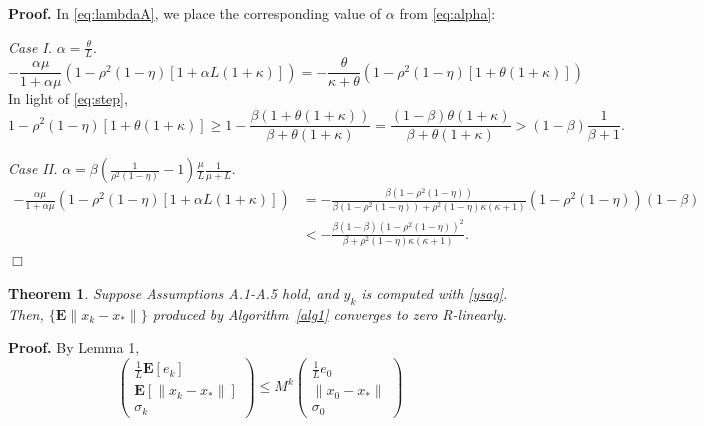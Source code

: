 \documentclass[11pt]{article}
\newtheorem{thm}{Theorem}
\newcommand{\E}{\mathbf{E}}
\begin{document}
\noindent 
\textbf{Proof.} In \eqref{eq:lambdaA}, we place the corresponding value of $\alpha$ from \eqref{eq:alpha}:

\bigskip

\textit{Case I.} $\alpha=\displaystyle\frac{\theta}{L}$. 
\[
 -\frac{\alpha\mu}{1+\alpha\mu}\left(1-\rho^2(1-\eta)[1+\alpha L(1+\kappa)]\right) = -\frac{\theta}{\kappa+\theta}\left(1-\rho^2(1-\eta)[1+\theta(1+\kappa)]\right)
\]
In light of \eqref{eq:step}, 
\[
 1-\rho^2(1-\eta)[1+\theta(1+\kappa)]\geq 1-\frac{\beta(1+\theta(1+\kappa))}{\beta+\theta(1+\kappa)} = \frac{(1-\beta)\theta(1+\kappa)}{\beta+\theta(1+\kappa)}> (1-\beta)\frac{1}{\beta+1}.
\]

\bigskip

\textit{Case II.} $\alpha = \displaystyle\beta\left(\frac{1}{\rho^2(1-\eta)}-1\right)\frac{\mu}{L}\frac{1}{\mu+L}$.
\begin{align*}
 -\frac{\alpha\mu}{1+\alpha\mu}\left(1-\rho^2(1-\eta)[1+\alpha L(1+\kappa)]\right) &= -\frac{\beta(1-\rho^2(1-\eta))}{\beta(1-\rho^2(1-\eta))+\rho^2(1-\eta)\kappa(\kappa+1)}(1-\rho^2(1-\eta))(1-\beta)\\
 & < -\frac{\beta(1-\beta)(1-\rho^2(1-\eta))^2}{\beta+\rho^2(1-\eta)\kappa(\kappa+1)}.
\end{align*}
\hspace*{\fill}$\Box$\medskip

\bigskip

\begin{thm}\label{thm:linear}
 Suppose Assumptions A.1-A.5 hold, and $y_k$ is computed with \eqref{ysag}.  Then, $\{\E\|x_k-x_\ast\|\}$ produced by Algorithm~\ref{alg1} converges to zero R-linearly.
\end{thm}

\noindent 
\textbf{Proof.}  By Lemma 1, 
\begin{equation}\label{eq:control}
 \begin{pmatrix} \frac{1}{L}\E[e_k]\\ \E[\|x_k-x_\ast \|] \\ \sigma_k \end{pmatrix} 
\leq M^k
 \begin{pmatrix} \frac{1}{L}e_0 \\ \| x_0-x_\ast \| \\ \sigma_0 \end{pmatrix} 
\end{equation}
\end{document}

